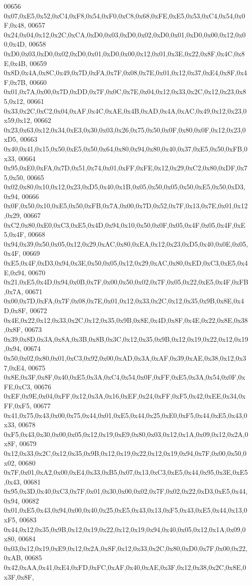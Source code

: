 \begin{DoxyCode}
00656 0x07,0xE5,0x52,0xC4,0xF8,0x54,0xF0,0xC8,0x68,0xFE,0xE5,0x53,0xC4,0x54,0x0F,0x48,
00657 0x24,0x04,0x12,0x2C,0xCA,0xD0,0x03,0xD0,0x02,0xD0,0x01,0xD0,0x00,0x12,0x00,0x4D,
00658 0xD0,0x03,0xD0,0x02,0xD0,0x01,0xD0,0x00,0x12,0x01,0x3E,0x22,0x8F,0x4C,0x8E,0x4B,
00659 0x8D,0x4A,0x8C,0x49,0x7D,0xFA,0x7F,0x08,0x7E,0x01,0x12,0x37,0xE4,0x8F,0x4F,0x7B,
00660 0x01,0x7A,0x00,0x7D,0xDD,0x7F,0x0C,0x7E,0x04,0x12,0x33,0x2C,0x12,0x23,0x85,0x12,
00661 0x33,0x2C,0xC2,0x04,0xAF,0x4C,0xAE,0x4B,0xAD,0x4A,0xAC,0x49,0x12,0x23,0x59,0x12,
00662 0x23,0x63,0x12,0x34,0xE3,0x30,0x03,0x26,0x75,0x50,0x0F,0x80,0x0F,0x12,0x23,0xD5,
00663 0x40,0x41,0x15,0x50,0xE5,0x50,0x64,0x80,0x94,0x80,0x40,0x37,0xE5,0x50,0xFB,0x33,
00664 0x95,0xE0,0xFA,0x7D,0x51,0x74,0x01,0xFF,0xFE,0x12,0x29,0xC2,0x80,0xDF,0x75,0x50,
00665 0x02,0x80,0x10,0x12,0x23,0xD5,0x40,0x1B,0x05,0x50,0x05,0x50,0xE5,0x50,0xD3,0x94,
00666 0x0F,0x50,0x10,0xE5,0x50,0xFB,0x7A,0x00,0x7D,0x52,0x7F,0x13,0x7E,0x01,0x12,0x29,
00667 0xC2,0x80,0xE0,0xC3,0xE5,0x4D,0x94,0x10,0x50,0x0F,0x05,0x4F,0x05,0x4F,0xE5,0x4F,
00668 0x94,0x39,0x50,0x05,0x12,0x29,0xAC,0x80,0xEA,0x12,0x23,0xD5,0x40,0x0E,0x05,0x4F,
00669 0xE5,0x4F,0xD3,0x94,0x3E,0x50,0x05,0x12,0x29,0xAC,0x80,0xED,0xC3,0xE5,0x4E,0x94,
00670 0x21,0xE5,0x4D,0x94,0x0B,0x7F,0x00,0x50,0x02,0x7F,0x05,0x22,0xE5,0x4F,0xFB,0x7A,
00671 0x00,0x7D,0xFA,0x7F,0x08,0x7E,0x01,0x12,0x33,0x2C,0x12,0x35,0x9B,0x8E,0x4D,0x8F,
00672 0x4E,0x22,0x12,0x33,0x2C,0x12,0x35,0x9B,0x8E,0x4D,0x8F,0x4E,0x22,0x8E,0x38,0x8F,
00673 0x39,0x8D,0x3A,0x8A,0x3B,0x8B,0x3C,0x12,0x35,0x9B,0x12,0x19,0x22,0x12,0x19,0x94,
00674 0x50,0x02,0x80,0x01,0xC3,0x92,0x00,0xAD,0x3A,0xAF,0x39,0xAE,0x38,0x12,0x37,0xE4,
00675 0x8E,0x3F,0x8F,0x40,0xE5,0x3A,0xC4,0x54,0x0F,0xFF,0xE5,0x3A,0x54,0x0F,0xFE,0xC3,
00676 0xEF,0x9E,0x04,0xFF,0x12,0x3A,0x16,0xEF,0x24,0xFF,0xF5,0x42,0xEE,0x34,0xFF,0xF5,
00677 0x41,0x75,0x43,0x00,0x75,0x44,0x01,0xE5,0x44,0x25,0xE0,0xF5,0x44,0xE5,0x43,0x33,
00678 0xF5,0x43,0x30,0x00,0x05,0x12,0x19,0xE9,0x80,0x03,0x12,0x1A,0x09,0x12,0x2A,0x8F,
00679 0x12,0x33,0x2C,0x12,0x35,0x9B,0x12,0x19,0x22,0x12,0x19,0x94,0x7F,0x00,0x50,0x02,
00680 0x7F,0x01,0xA2,0x00,0xE4,0x33,0xB5,0x07,0x13,0xC3,0xE5,0x44,0x95,0x3E,0xE5,0x43,
00681 0x95,0x3D,0x40,0xC3,0x7F,0x01,0x30,0x00,0x02,0x7F,0x02,0x22,0xD3,0xE5,0x44,0x94,
00682 0x01,0xE5,0x43,0x94,0x00,0x40,0x25,0xE5,0x43,0x13,0xF5,0x43,0xE5,0x44,0x13,0xF5,
00683 0x44,0x12,0x35,0x9B,0x12,0x19,0x22,0x12,0x19,0x94,0x40,0x05,0x12,0x1A,0x09,0x80,
00684 0x03,0x12,0x19,0xE9,0x12,0x2A,0x8F,0x12,0x33,0x2C,0x80,0xD0,0x7F,0x00,0x22,0xAB,
00685 0x42,0xAA,0x41,0xE4,0xFD,0xFC,0xAF,0x40,0xAE,0x3F,0x12,0x38,0x2C,0x8E,0x3F,0x8F,

\end{DoxyCode}
